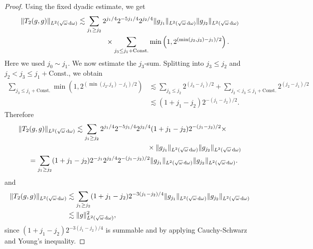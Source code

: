\documentclass[reqno,11pt,letterpaper]{amsart}
\numberwithin{equation}{section}
\newcommand{\dd}{\, {\rm d}}
\begin{document}
\begin{proof}
Using the fixed dyadic estimate, we get
\begin{align*}
\|T_2(g,g)\|_{L^2(\sqrt{\omega}\dd\omega)}
&\lesssim
\sum_{j_1\ge j_2}
2^{j_1/4}
2^{-5j_1/4}
2^{j_2/4}
\|g_{j_1}\|_{L^2(\sqrt{\omega}\dd\omega)} \|g_{j_2}\|_{L^2(\sqrt{\omega}\dd\omega)} 
\\
&\qquad\qquad\times
\sum_{j_3\le j_1+\text{Const.}}
\min\left(1,2^{(\min(j_2,j_3)-j_1)/2}\right).
\end{align*}
Here we used $j_0\sim j_1$. We now estimate the
$j_3$-sum. Splitting into
$j_3\le j_2$ and $j_2<j_3\le j_1+\text{Const.}$, we obtain
\begin{align*}
\sum_{j_3\le j_1+\text{Const.}}
\min\left(1,2^{(\min(j_2,j_3)-j_1)/2}\right)
&\lesssim
\sum_{j_3\le j_2}2^{(j_3-j_1)/2}
+ \sum_{j_2<j_3\le j_1+\text{Const.}}2^{(j_2-j_1)/2}
\\
&\lesssim
(1+j_1-j_2)2^{-(j_1-j_2)/2}.
\end{align*}
Therefore
\begin{align*}
&\|T_2(g,g)\|_{L^2(\sqrt{\omega}\dd\omega)}
\lesssim
\sum_{j_1\ge j_2}
2^{j_1/4} 2^{-5j_1/4} 2^{j_2/4}
(1+j_1-j_2)2^{-(j_1-j_2)/2}\times \\
&\hskip 6.5cm \times \|g_{j_1}\|_{L^2(\sqrt{\omega}\dd\omega)} \|g_{j_2}\|_{L^2(\sqrt{\omega}\dd\omega)} 
\\
&\hskip 0.5cm=
\sum_{j_1\ge j_2}
(1+j_1-j_2) 2^{-j_1} 2^{j_2/4} 2^{-(j_1-j_2)/2}
\|g_{j_1}\|_{L^2(\sqrt{\omega}\dd\omega)} \|g_{j_2}\|_{L^2(\sqrt{\omega}\dd\omega)}.
\end{align*}
and 
\begin{align*}
\|T_2(g,g)\|_{L^2(\sqrt{\omega}\dd\omega)}
&\lesssim
\sum_{j_1\ge j_2}
(1+j_1-j_2)2^{-3(j_1-j_2)/4}
\|g_{j_1}\|_{L^2(\sqrt{\omega}\dd\omega)} \|g_{j_2}\|_{L^2(\sqrt{\omega}\dd\omega)}\\
&\lesssim
\|g\|_{L^2(\sqrt{\omega}\dd\omega)}^2, 
\end{align*}
since $(1+j_1-j_2)2^{-3(j_1-j_2)/4}$ is summable and by applying Cauchy-Schwarz and Young's inequality. 


\end{proof}
\end{document}
